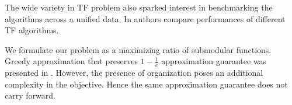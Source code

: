 The wide variety in TF problem also sparked interest in benchmarking the algorithms across a unified data. In \cite{wang2015comparative} authors compare performances of different TF algorithms. 

We formulate our problem as a maximizing ratio of submodular functions. Greedy approximation that preserves $1 - \frac{1}{e}$ approximation guarantee was presented in \cite{bai2016algorithms}. However, the presence of organization poses an additional complexity in the objective. Hence the same approximation guarantee does not carry forward. 


